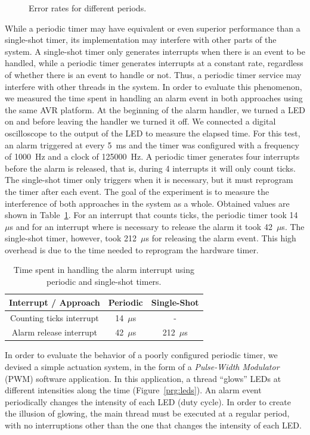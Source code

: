 \documentclass[final,3pd,times]{elsarticle}
\newcommand{\fig}[4][tbp]{
  \begin{figure}[#1]
    {\centering{\texttt{[image: \#2]}}\par}
    \caption{#3}
    \label{fig:#2}
  \end{figure}
}
\newcommand{\us}{$\mu$s}
\begin{document}
\fig[ht]{error}{Error rates for different periods.}{scale=0.65}

While a periodic timer may have equivalent or even superior performance
than a single-shot timer, its implementation may interfere with other
parts of the system. A single-shot timer only generates interrupts when
there is an event to be handled, while a periodic timer generates
interrupts at a constant rate, regardless of whether there is an event
to handle or not.  Thus, a periodic timer service may interfere with
other threads in the system. In order to evaluate this phenomenon, we
measured the time spent in handling an alarm event in both approaches
using the same AVR platform. At the beginning of the alarm handler, we
turned a LED on and before leaving the handler we turned it off. We
connected a digital oscilloscope to the output of the LED to measure the
elapsed time.  For this test, an alarm triggered at every 5~ms and the
timer was configured with a frequency of 1000~Hz and a clock of
125000~Hz. A periodic timer generates four interrupts before the alarm
is released, that is, during 4 interrupts it will only count ticks.  The
single-shot timer only triggers when it is necessary, but it must
reprogram the timer after each event. The goal of the experiment is to
measure the interference of both approaches in the system as a whole.
Obtained values are shown in Table~\ref{tab:handler_time}.  For an
interrupt that counts ticks, the periodic timer took 14~\us{} and for an
interrupt where is necessary to release the alarm it took 42~\us{}.  The
single-shot timer, however, took 212~\us{} for releasing the alarm
event. This high overhead is due to the time needed to reprogram the
hardware timer.

\begin{table}[bht]
\centering
\scriptsize{
\begin{tabular}{c|c|c}
\textbf{Interrupt / Approach} & \textbf{Periodic} & \textbf{Single-Shot} \\
\hline
Counting ticks interrupt & 14~\us{} & - \\
Alarm release interrupt  & 42~\us{} & 212~\us{} \\
\end{tabular}
}
\caption{Time spent in handling the alarm interrupt using periodic and single-shot timers.}
\label{tab:handler_time}
\end{table}

In order to evaluate the behavior of a poorly configured periodic timer,
we devised a simple actuation system, in the form of a \emph{Pulse-Width
  Modulator} (PWM) software application. In this application, a thread
``glows'' LEDs at different intensities along the time
(Figure~\ref{prg:leds}).  An alarm event periodically changes the
intensity of each LED (duty cycle).  In order to create the illusion of
glowing, the main thread must be executed at a regular period, with no
interruptions other than the one that changes the intensity of each LED.
\end{document}
